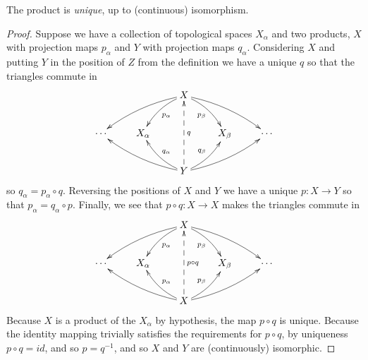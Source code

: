         \begin{claim}
          \label{claim:uniqprod}
          The product is \emph{unique}, up to (continuous) isomorphism.
          \begin{proof}
            Suppose we have a collection of topological spaces $X_\alpha$ and two products, $X$ with projection maps $p_\alpha$ and $Y$ with projection maps $q_\alpha$.
            Considering $X$ and putting $Y$ in the position of $Z$ from the definition we have a unique $q$ so that the triangles commute in
            \begin{displaymath}
              \xymatrix{
                && X \ar@/_/[dll] \ar@/_/[dl]^{p_\alpha} \ar@/^/[dr]_{p_\beta} \ar@/^/[drr] \\
                \cdots & X_\alpha && X_\beta & \cdots\\
                && Y \ar@/^/[ull] \ar@/^/[ul]_{q_\alpha} \ar@{-->}[uu]_q \ar@/_/[ur]^{q_\beta} \ar@/_/[urr]
               }
            \end{displaymath}
            so $q_\alpha=p_\alpha\circ q$.
            Reversing the positions of $X$ and $Y$ we have a unique $p:X\rightarrow Y$ so that $p_\alpha=q_\alpha\circ p$.
            Finally, we see that $p\circ q:X\rightarrow X$ makes the triangles commute in
            \begin{displaymath}
              \xymatrix{
                && X \ar@/_/[dll] \ar@/_/[dl]^{p_\alpha} \ar@/^/[dr]_{p_\beta} \ar@/^/[drr] \\
                \cdots & X_\alpha && X_\beta & \cdots\\
                && X \ar@/^/[ull] \ar@/^/[ul]_{p_\alpha} \ar@{-->}[uu]_{p\circ q} \ar@/_/[ur]^{p_\beta} \ar@/_/[urr]
               }
            \end{displaymath}
            Because $X$ is a product of the $X_\alpha$ by hypothesis, the map $p\circ q$ is unique.
            Because the identity mapping trivially satisfies the requirements for $p\circ q$, by uniqueness $p\circ q=id$, and so $p=q^{-1}$, and so $X$ and $Y$ are (continuously) isomorphic.
          \end{proof}
        \end{claim}

